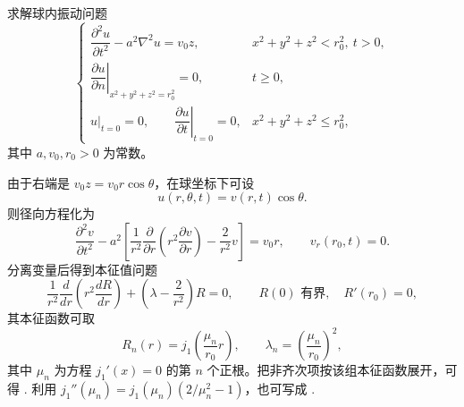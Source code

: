 \begin{question}[25分]

求解球内振动问题
\[
\begin{cases}
\dfrac{\partial^2u}{\partial t^2}-a^2\nabla^2u=v_0z, & x^2+y^2+z^2<r_0^2,\ t>0,\\[4pt]
\left.\dfrac{\partial u}{\partial n}\right|_{x^2+y^2+z^2=r_0^2}=0, & t\ge 0,\\[4pt]
u|_{t=0}=0,\qquad \left.\dfrac{\partial u}{\partial t}\right|_{t=0}=0, & x^2+y^2+z^2\le r_0^2,
\end{cases}
\]
其中 $a,v_0,r_0>0$ 为常数。

\begin{solution}

由于右端是 $v_0z=v_0r\cos\theta$，在球坐标下可设
\[
u(r,\theta,t)=v(r,t)\cos\theta.
\]
则径向方程化为
\[
\frac{\partial^2v}{\partial t^2}-a^2\left[\frac1{r^2}\frac{\partial}{\partial r}\left(r^2\frac{\partial v}{\partial r}\right)-\frac{2}{r^2}v\right]=v_0r,
\qquad v_r(r_0,t)=0.
\]
分离变量后得到本征值问题
\[
\frac1{r^2}\frac{d}{dr}\left(r^2\frac{dR}{dr}\right)+\left(\lambda-\frac{2}{r^2}\right)R=0,
\qquad R(0)\text{ 有界},\quad R'(r_0)=0,
\]
其本征函数可取
\[
R_n(r)=j_1\!\left(\frac{\mu_n}{r_0}r\right),
\qquad \lambda_n=\left(\frac{\mu_n}{r_0}\right)^2,
\]
其中 $\mu_n$ 为方程 $j_1'(x)=0$ 的第 $n$ 个正根。把非齐次项按该组本征函数展开，可得
.
利用 $j_1''(\mu_n)=j_1(\mu_n)(2/\mu_n^2-1)$，也可写成
.

\end{solution}
\end{question}

